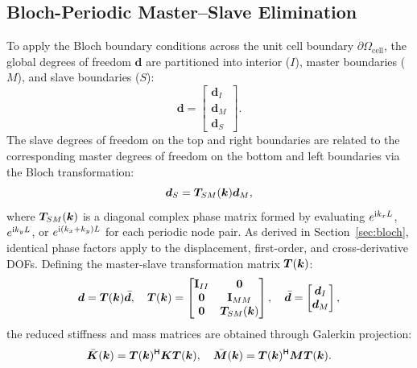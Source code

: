 \subsection{Bloch-Periodic Master--Slave Elimination}
To apply the Bloch boundary conditions across the unit cell boundary $\partial\Omega_{\mathrm{cell}}$, the global degrees of freedom $\bm{d}$ are partitioned into interior ($I$), master boundaries ($M$), and slave boundaries ($S$):
\begin{equation}
\bm{d} = \begin{bmatrix} \bm{d}_I \\ \bm{d}_M \\ \bm{d}_S \end{bmatrix}.
\label{eq:d_partition}
\end{equation}
The slave degrees of freedom on the top and right boundaries are related to the corresponding master degrees of freedom on the bottom and left boundaries via the Bloch transformation:
\begin{equation}
\bm{d}_S = \bm{T}_{SM}(\bm{k}) \bm{d}_M,
\label{eq:slave_master_rel}
\end{equation}
where $\bm{T}_{SM}(\bm{k})$ is a diagonal complex phase matrix formed by evaluating $e^{\mathrm{i} k_x L}$, $e^{\mathrm{i} k_y L}$, or $e^{\mathrm{i} (k_x + k_y)L}$ for each periodic node pair. As derived in Section~\ref{sec:bloch}, identical phase factors apply to the displacement, first-order, and cross-derivative DOFs. Defining the master-slave transformation matrix $\bm{T}(\bm{k})$:
\begin{equation}
\bm{d} = \bm{T}(\bm{k}) \bar{\bm{d}}, \quad \bm{T}(\bm{k}) = \begin{bmatrix} \mathbf{I}_{II} & \mathbf{0} \\ \mathbf{0} & \mathbf{I}_{MM} \\ \mathbf{0} & \bm{T}_{SM}(\bm{k}) \end{bmatrix}, \quad \bar{\bm{d}} = \begin{bmatrix} \bm{d}_I \\ \bm{d}_M \end{bmatrix},
\label{eq:T_bloch}
\end{equation}
the reduced stiffness and mass matrices are obtained through Galerkin projection:
\begin{equation}
\bar{\bm{K}}(\bm{k}) = \bm{T}(\bm{k})^\mathsf{H} \bm{K} \bm{T}(\bm{k}), \quad \bar{\bm{M}}(\bm{k}) = \bm{T}(\bm{k})^\mathsf{H} \bm{M} \bm{T}(\bm{k}).
\label{eq:reduced_KM}
\end{equation}

